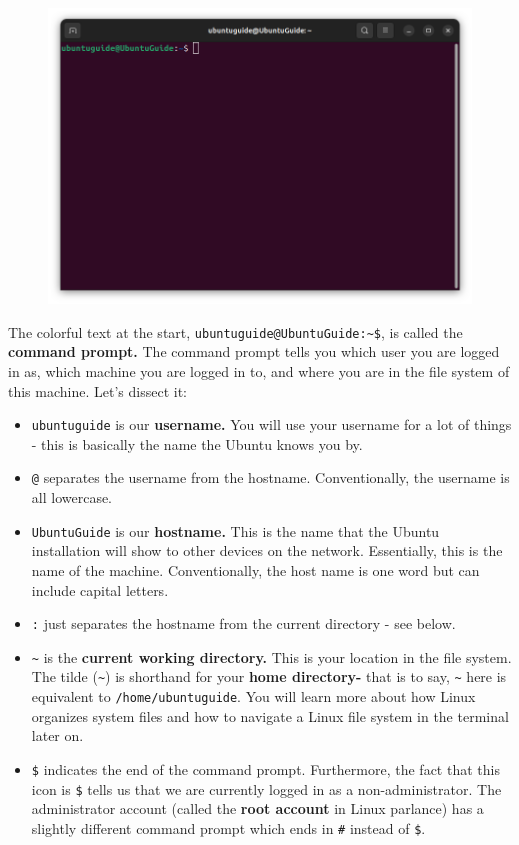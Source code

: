 \documentclass[12pt]{article}
\begin{document}
\begin{figure}[htp]
    \centering
    \includegraphics[width=\textwidth]{2-5.png}
\end{figure}

The colorful text at the start, \verb|ubuntuguide@UbuntuGuide:~$|, is called the \textbf{command prompt.} The command prompt tells you which user you are logged in as, which machine you are logged in to, and where you are in the file system of this machine. Let's dissect it:

\begin{itemize}
    \item \verb|ubuntuguide| is our \textbf{username.} You will use your username for a lot of things - this is basically the name the Ubuntu knows you by.
    \item \verb|@| separates the username from the hostname. Conventionally, the username is all lowercase.
    \item \verb|UbuntuGuide| is our \textbf{hostname.} This is the name that the Ubuntu installation will show to other devices on the network. Essentially, this is the name of the machine. Conventionally, the host name is one word but can include capital letters.
    \item \verb|:| just separates the hostname from the current directory - see below.
    \item \verb|~| is the \textbf{current working directory.} This is your location in the file system. The tilde (\verb|~|) is shorthand for your \textbf{home directory-} that is to say, \verb|~| here is equivalent to \verb|/home/ubuntuguide|. You will learn more about how Linux organizes system files and how to navigate a Linux file system in the terminal later on. 
    \item \verb|$| indicates the end of the command prompt. Furthermore, the fact that this icon is \verb|$| tells us that we are currently logged in as a non-administrator. The administrator account (called the \textbf{root account} in Linux parlance) has a slightly different command prompt which ends in \verb|#| instead of \verb|$|.
 \end{itemize}
\end{document}
